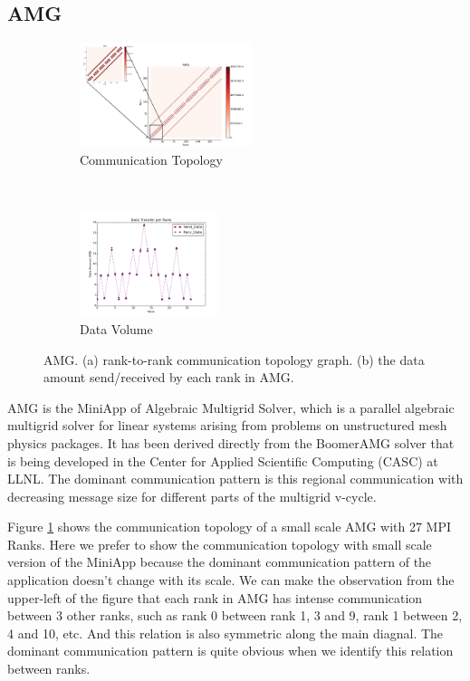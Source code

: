 \documentclass[conference]{IEEEtran}
\begin{document}
\subsection{AMG}
\label{sec:amg}


\begin{figure}[t!]
    \centering
    \begin{subfigure}[t]{0.22\textwidth}
        \centering
        \includegraphics[height=1.2in]{figs/appstudy/amg/amg_pip}
        \caption{Communication Topology}
        \label{fig: amg communication topology}
    \end{subfigure}%
    ~
    \begin{subfigure}[t]{0.22\textwidth}
        \centering
        \includegraphics[height=1.2in]{figs/appstudy/amg/amg_data_transfer}
        \caption{Data Volume}
        \label{fig: amg data trans}
    \end{subfigure}
    \caption{AMG. (a) rank-to-rank communication topology graph. (b) the data amount send/received by each rank in AMG.}
\end{figure}

AMG is the MiniApp of Algebraic Multigrid Solver, which is a parallel algebraic multigrid solver for linear systems arising from problems on unstructured mesh physics packages. It has been derived directly from the BoomerAMG solver that is being developed in the Center for Applied Scientific Computing (CASC) at LLNL\cite{amg}. The dominant communication pattern is this regional communication with decreasing message size for different parts of the multigrid v-cycle.

Figure \ref{fig: amg communication topology} shows the communication topology of a small scale AMG with 27 MPI Ranks. Here we prefer to show the communication topology with small scale version of the MiniApp because the dominant communication pattern of the application doesn't change with its scale. We can make the observation from the upper-left of the figure that each rank in AMG has intense communication between 3 other ranks, such as rank 0 between rank 1, 3 and 9, rank 1 between 2, 4 and 10, etc. And this relation is also symmetric along the main diagnal. The dominant communication pattern is quite obvious when we identify this relation between ranks.
\end{document}
